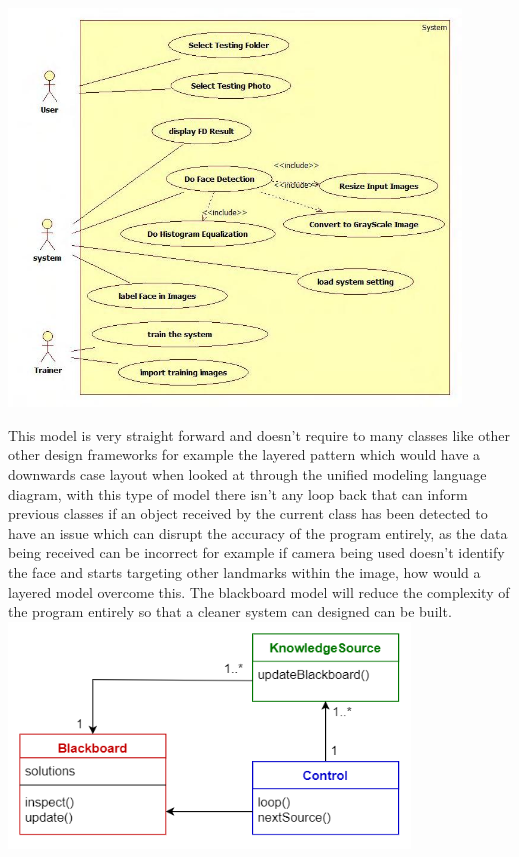 \includegraphics[width=0.9\textwidth]{Figures/UMLDrowsinessDetection.jpg}

This model is very straight forward and doesn't require to many classes like other other design frameworks for example the layered pattern which would have a downwards case layout when looked at through the unified modeling language diagram, with this type of model there isn't any loop back that can inform previous classes if an object received by the current class has been detected to have an issue which can disrupt the accuracy of the program entirely, as the data being received can be incorrect for example if camera being used doesn't identify the face and starts targeting other landmarks within the image, how would a layered model overcome this. The blackboard model will reduce the complexity of the program entirely so that a cleaner system can designed can be built.
\includegraphics[width=0.8\textwidth]{Figures/Blackboard.png}
